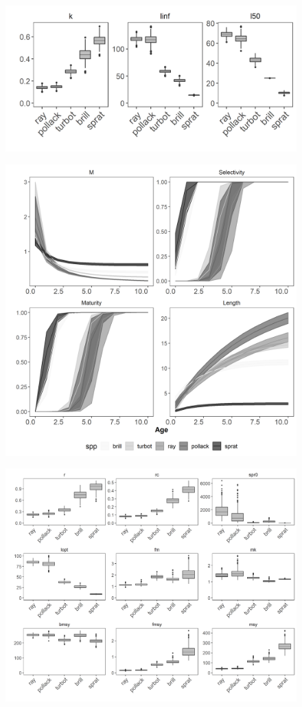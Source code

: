 \documentclass[preprint,12pt]{elsarticle}
\begin{document}
\begin{figure}[]\centering\includegraphics[width=5in]{fig1.png}\caption{}\label{fig:fig1}\end{figure}
\begin{figure}[]\centering\includegraphics[width=5in]{fig2.png}\caption{}\label{fig:fig2}\end{figure}
\begin{figure}[]\centering\includegraphics[width=5in]{fig3.png}\caption{}\label{fig:fig3}\end{figure}
\end{document}
